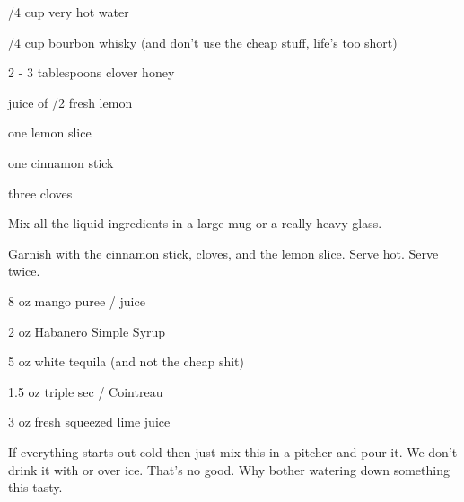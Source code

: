 %
%
%
%
\newpage



\begin{IngredientsAndSteps}
      \ListIngredientsAndSteps
      {
            /4 cup very hot water

            /4 cup bourbon whisky (and don't use the cheap stuff, life's too short)

            2 - 3 tablespoons clover honey

            juice of /2 fresh lemon

            one lemon slice

            one cinnamon stick

            three cloves
      }
      {
            Mix all the liquid ingredients in a large mug or a really heavy glass.

            Garnish with the cinnamon stick, cloves, and the lemon slice. Serve hot. Serve twice.
      }
\end{IngredientsAndSteps}

%
%
%
%
\newpage



\begin{IngredientsAndSteps}
      \ListIngredientsAndSteps
      {
            8 oz mango puree / juice

            2 oz Habanero Simple Syrup

            5 oz white tequila (and not the cheap shit)

            1.5 oz triple sec / Cointreau

            3 oz fresh squeezed lime juice
      }
      {
            If everything starts out cold then just mix this in a pitcher and pour it. We don't drink
            it with or over ice. That's no good. Why bother watering down something this tasty.
      }
\end{IngredientsAndSteps}

